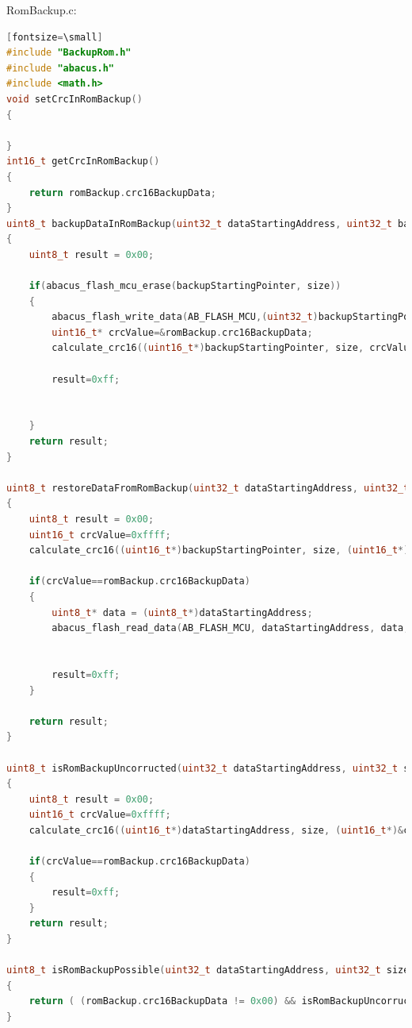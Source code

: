 \documentclass[LaM,binding=0.6cm]{../sapthesis}
\begin{document}
RomBackup.c:
\begin{lstlisting}[language=c][fontsize=\small]
#include "BackupRom.h"
#include "abacus.h"
#include <math.h>
void setCrcInRomBackup()
{

}
int16_t getCrcInRomBackup()
{
    return romBackup.crc16BackupData;
}
uint8_t backupDataInRomBackup(uint32_t dataStartingAddress, uint32_t backupStartingPointer, uint32_t size)
{
    uint8_t result = 0x00;

    if(abacus_flash_mcu_erase(backupStartingPointer, size))
    {
        abacus_flash_write_data(AB_FLASH_MCU,(uint32_t)backupStartingPointer,(uint8_t*)dataStartingAddress,size);
        uint16_t* crcValue=&romBackup.crc16BackupData;
        calculate_crc16((uint16_t*)backupStartingPointer, size, crcValue, 1);

        result=0xff;


    }
    return result;
}

uint8_t restoreDataFromRomBackup(uint32_t dataStartingAddress, uint32_t backupStartingPointer, uint32_t size)
{
    uint8_t result = 0x00;
    uint16_t crcValue=0xffff;
    calculate_crc16((uint16_t*)backupStartingPointer, size, (uint16_t*)&crcValue, 1);

    if(crcValue==romBackup.crc16BackupData)
    {
        uint8_t* data = (uint8_t*)dataStartingAddress;
        abacus_flash_read_data(AB_FLASH_MCU, dataStartingAddress, data, PERSISTENT_RAM_LENGTH);


        result=0xff;
    }

    return result;
}

uint8_t isRomBackupUncorructed(uint32_t dataStartingAddress, uint32_t size)
{
    uint8_t result = 0x00;
    uint16_t crcValue=0xffff;
    calculate_crc16((uint16_t*)dataStartingAddress, size, (uint16_t*)&crcValue, 1);

    if(crcValue==romBackup.crc16BackupData)
    {
        result=0xff;
    }
    return result;
}

uint8_t isRomBackupPossible(uint32_t dataStartingAddress, uint32_t size)
{
    return ( (romBackup.crc16BackupData != 0x00) && isRomBackupUncorructed(dataStartingAddress,size) );
}

\end{lstlisting}
\end{document}
